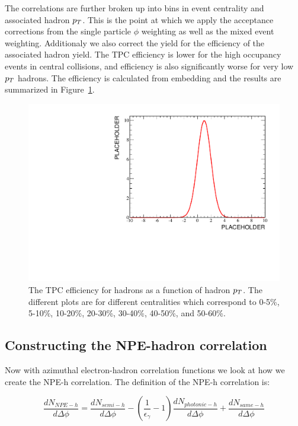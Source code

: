 The correlations are further broken up into bins in event centrality and associated hadron $p_{T}$. This is the point at which we apply the acceptance corrections from the single particle $\phi$ weighting as well as the mixed event weighting. Additionaly we also correct the yield for the efficiency of the associated hadron yield. The TPC efficiency is lower for the high occupancy events in central collisions, and efficiency is also significantly worse for very low $p_{T}$ hadrons. The efficiency is calculated from embedding and the results are summarized in Figure~\ref{fig:assoheff}.

\begin{figure}[htbp]
\begin{center}
\includegraphics[scale=.8]{Plots/Placeholder.pdf}
\end{center}
\caption[Associated hadron efficiency]{The TPC efficiency for hadrons as a function of hadron $p_{T}$. The different plots are for different centralities which correspond to 0-5\%, 5-10\%, 10-20\%, 20-30\%, 30-40\%, 40-50\%, and 50-60\%.}
\label{fig:assoheff}
\end{figure}

\subsection{Constructing the NPE-hadron correlation}

Now with azimuthal electron-hadron correlation functions we look at how we create the NPE-h correlation. The definition of the NPE-h correlation is:

\begin{equation}\label{eq:NPEhdef}
 \frac{dN_{NPE-h}}{d\Delta\phi} = \frac{dN_{semi-h}}{d\Delta\phi} - \left(\frac{1}{\epsilon_{\gamma}} - 1\right)\frac{dN_{photonic-h}}{d\Delta\phi} + \frac{dN_{same-h}}{d\Delta\phi}   
\end{equation} 

